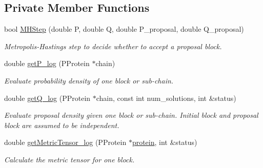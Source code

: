 \subsection*{Private Member Functions}
\begin{DoxyCompactItemize}
\item 
bool \hyperlink{classSLIKMCSampler_a4c92bd60cdfd4006b528f652f290fd7a}{M\-H\-Step} (double P, double Q, double P\-\_\-proposal, double Q\-\_\-proposal)
\begin{DoxyCompactList}\small\item\em Metropolis-\/\-Hastings step to decide whether to accept a proposal block. \end{DoxyCompactList}\item 
double \hyperlink{classSLIKMCSampler_a10615e4dc6351319fabbf80ccb329665}{get\-P\-\_\-log} (P\-Protein $\ast$chain)
\begin{DoxyCompactList}\small\item\em Evaluate probability density of one block or sub-\/chain. \end{DoxyCompactList}\item 
double \hyperlink{classSLIKMCSampler_a1ef8cd1fe45f9cd2d188b35133be9e58}{get\-Q\-\_\-log} (P\-Protein $\ast$chain, const int num\-\_\-solutions, int \&status)
\begin{DoxyCompactList}\small\item\em Evaluate proposal density given one block or sub-\/chain. Initial block and proposal block are assumed to be independent. \end{DoxyCompactList}\item 
double \hyperlink{classSLIKMCSampler_a0f35fb022d1a49ced92706301c1c3d80}{get\-Metric\-Tensor\-\_\-log} (P\-Protein $\ast$\hyperlink{classSLIKMCSampler_aa12ccdc8addc18cdb4c48156912811a6}{protein}, int \&status)
\begin{DoxyCompactList}\small\item\em Calculate the metric tensor for one block. \end{DoxyCompactList}\end{DoxyCompactItemize}
